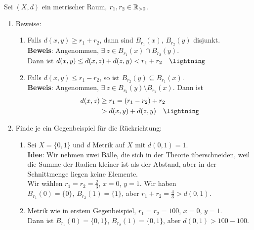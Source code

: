 \begin{problem*}[3]
  Sei $ (X, d) $ ein metrischer Raum, $ r_1, r_2 \in \mathbb{R}_{>0} $.
  \begin{enumerate}
    \item Beweise: 
    \begin{enumerate}
      \item Falls $ d(x, y) \geq r_1 + r_2 $, dann sind $ B_{r_1}(x) $, $ B_{r_2}(y) $ disjunkt. \\
        \textbf{Beweis}: Angenommen, $ \exists \ z \in B_{r_1}(x) \cap B_{r_2}(y) $. \\
        Dann ist $ d(x,y) \leq d(x,z) + d(z,y) < r_1 + r_2 \quad \lightning \qed $ \\
      \item Falls $ d(x,y) \leq r_1-r_2 $, so ist $ B_{r_2}(y) \subseteq B_{r_1}(x) $. \\
      \textbf{Beweis}: Angenommen, $ \exists \ z \in B_{r_2}(y) \setminus B_{r_1}(x) $. Dann ist
      \begin{align*}
        d(x,z) &\geq r_1 = (r_1 - r_2) + r_2 \\
        &> d(x,y) + d(z, y) \quad \lightning \qed
      \end{align*}
    \end{enumerate}
    \item Finde je ein Gegenbeispiel für die Rückrichtung:
    \begin{enumerate}
      \item Sei $ X = \{ 0,1 \} $ und $ d $ Metrik auf $ X $ mit $ d(0,1) = 1 $. \\
        \textbf{Idee}: Wir nehmen zwei Bälle, die sich in der Theorie überschneiden, weil die Summe der Radien kleiner ist als der Abstand, aber in der Schnittmenge liegen keine Elemente. \\
        Wir wählen $ r_1 = r_2 = \frac{2}{3} $, $ x = 0 $, $ y = 1 $. Wir haben \\
        $ B_{r_1}(0) = \{ 0 \} $, $ B_{r_2}(1) = \{ 1 \} $, aber $ r_1 + r_2 = \frac{4}{3} > d(0,1) $. 
        \item Metrik wie in erstem Gegenbeispiel, $ r_1 = r_2 = 100 $, $ x = 0 $, $ y = 1 $. \\
        Dann ist $ B_{r_1}(0) = \{ 0,1 \} $, $ B_{r_2}(1) = \{ 0,1 \} $, aber $ d(0,1) > 100 - 100 $.
    \end{enumerate}
  \end{enumerate}
\end{problem*}

